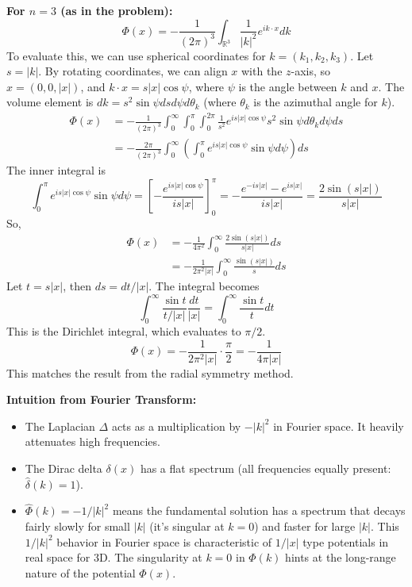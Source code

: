 \textbf{For $n=3$ (as in the problem):}
\[
\Phi(x) = -\frac{1}{(2\pi)^3} \int_{\mathbb{R}^3} \frac{1}{|k|^2} e^{i k \cdot x} dk
\]
To evaluate this, we can use spherical coordinates for $k=(k_1, k_2, k_3)$. Let $s = |k|$. By rotating coordinates, we can align $x$ with the $z$-axis, so $x=(0,0,|x|)$, and $k \cdot x = s |x| \cos\psi$, where $\psi$ is the angle between $k$ and $x$. The volume element is $dk = s^2 \sin\psi ds d\psi d\theta_k$ (where $\theta_k$ is the azimuthal angle for $k$).
\[
\begin{aligned}
\Phi(x) &= -\frac{1}{(2\pi)^3} \int_0^\infty \int_0^\pi \int_0^{2\pi} \frac{1}{s^2} e^{i s |x| \cos\psi} s^2 \sin\psi d\theta_k d\psi ds \\
&= -\frac{2\pi}{(2\pi)^3} \int_0^\infty \left( \int_0^\pi e^{i s |x| \cos\psi} \sin\psi d\psi \right) ds
\end{aligned}
\]
The inner integral is
\[
\int_0^\pi e^{i s |x| \cos\psi} \sin\psi d\psi = \left[ -\frac{e^{i s |x| \cos\psi}}{i s |x|} \right]_0^\pi = -\frac{e^{-i s |x|} - e^{i s |x|}}{i s |x|} = \frac{2\sin(s|x|)}{s|x|}
\]
So,
\[
\begin{aligned}
\Phi(x) &= -\frac{1}{4\pi^2} \int_0^\infty \frac{2\sin(s|x|)}{s|x|} ds \\
&= -\frac{1}{2\pi^2 |x|} \int_0^\infty \frac{\sin(s|x|)}{s} ds
\end{aligned}
\]
Let $t = s|x|$, then $ds = dt/|x|$. The integral becomes
\[
\int_0^\infty \frac{\sin t}{t/|x|} \frac{dt}{|x|} = \int_0^\infty \frac{\sin t}{t} dt
\]
This is the Dirichlet integral, which evaluates to $\pi/2$.
\[
\Phi(x) = -\frac{1}{2\pi^2 |x|} \cdot \frac{\pi}{2} = -\frac{1}{4\pi|x|}
\]
This matches the result from the radial symmetry method.

\textbf{Intuition from Fourier Transform:}

\begin{itemize}
	\item The Laplacian $\Delta$ acts as a multiplication by $-|k|^2$ in Fourier space. It heavily attenuates high frequencies.
	\item The Dirac delta $\delta(x)$ has a flat spectrum (all frequencies equally present: $\widehat{\delta}(k)=1$).
	\item $\widehat{\Phi}(k) = -1/|k|^2$ means the fundamental solution has a spectrum that decays fairly slowly for small $|k|$ (it's singular at $k=0$) and faster for large $|k|$. This $1/|k|^2$ behavior in Fourier space is characteristic of $1/|x|$ type potentials in real space for 3D. The singularity at $k=0$ in $\widehat{\Phi}(k)$ hints at the long-range nature of the potential $\Phi(x)$.
\end{itemize}

